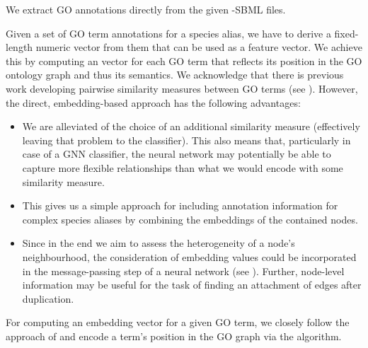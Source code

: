 \documentclass[
	fontsize=10pt, %
	twoside=false, %
	secnumdepth=1, %
  toc=indentunnumbered %
]{kaobook}
\begin{document}
We extract GO annotations directly from the given -SBML
files.

Given a set of GO term annotations for a species alias, we have to derive a
fixed-length numeric vector from them that can be used as a feature vector.
%
We achieve this by computing an  vector for each GO term that
reflects its position in the GO ontology graph and thus its semantics. We
acknowledge that there is previous work developing pairwise similarity measures
between GO terms (see ). However, the direct,
embedding-based approach has the following advantages:
%
\begin{itemize}
\item We are alleviated of the choice of an additional similarity measure
  (effectively leaving that problem to the classifier). This also means that,
  particularly in case of a GNN classifier, the neural network may potentially
  be able to capture more flexible relationships than what we would encode with
  some similarity measure.
\item This gives us a simple approach for including annotation information for
  complex species aliases by combining the embeddings of the contained nodes.
\item Since in the end we aim to assess the heterogeneity of a node's
  neighbourhood, the consideration of embedding values could be incorporated in
  the message-passing step of a neural network (see ). Further,
  node-level information may be useful for the task of finding an attachment of
  edges after duplication.
\end{itemize}

For computing an embedding vector for a given GO term, we closely follow the
approach of \citeauthor{zhong_GO2VecTransformingGO_2020}
\cite{zhong_GO2VecTransformingGO_2020} and encode a term's position in the GO
graph via the  algorithm.
\end{document}
